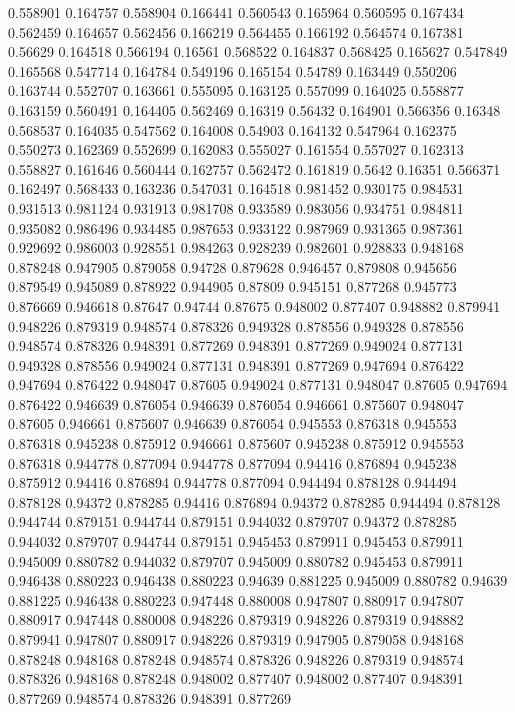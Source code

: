 0.558901 0.164757
0.558904 0.166441
0.560543 0.165964
0.560595 0.167434
0.562459 0.164657
0.562456 0.166219
0.564455 0.166192
0.564574 0.167381
0.56629 0.164518
0.566194 0.16561
0.568522 0.164837
0.568425 0.165627
0.547849 0.165568
0.547714 0.164784
0.549196 0.165154
0.54789 0.163449
0.550206 0.163744
0.552707 0.163661
0.555095 0.163125
0.557099 0.164025
0.558877 0.163159
0.560491 0.164405
0.562469 0.16319
0.56432 0.164901
0.566356 0.16348
0.568537 0.164035
0.547562 0.164008
0.54903 0.164132
0.547964 0.162375
0.550273 0.162369
0.552699 0.162083
0.555027 0.161554
0.557027 0.162313
0.558827 0.161646
0.560444 0.162757
0.562472 0.161819
0.5642 0.16351
0.566371 0.162497
0.568433 0.163236
0.547031 0.164518
0.981452 0.930175
0.984531 0.931513
0.981124 0.931913
0.981708 0.933589
0.983056 0.934751
0.984811 0.935082
0.986496 0.934485
0.987653 0.933122
0.987969 0.931365
0.987361 0.929692
0.986003 0.928551
0.984263 0.928239
0.982601 0.928833
0.948168 0.878248
0.947905 0.879058
0.94728 0.879628
0.946457 0.879808
0.945656 0.879549
0.945089 0.878922
0.944905 0.87809
0.945151 0.877268
0.945773 0.876669
0.946618 0.87647
0.94744 0.87675
0.948002 0.877407
0.948882 0.879941
0.948226 0.879319
0.948574 0.878326
0.949328 0.878556
0.949328 0.878556
0.948574 0.878326
0.948391 0.877269
0.948391 0.877269
0.949024 0.877131
0.949328 0.878556
0.949024 0.877131
0.948391 0.877269
0.947694 0.876422
0.947694 0.876422
0.948047 0.87605
0.949024 0.877131
0.948047 0.87605
0.947694 0.876422
0.946639 0.876054
0.946639 0.876054
0.946661 0.875607
0.948047 0.87605
0.946661 0.875607
0.946639 0.876054
0.945553 0.876318
0.945553 0.876318
0.945238 0.875912
0.946661 0.875607
0.945238 0.875912
0.945553 0.876318
0.944778 0.877094
0.944778 0.877094
0.94416 0.876894
0.945238 0.875912
0.94416 0.876894
0.944778 0.877094
0.944494 0.878128
0.944494 0.878128
0.94372 0.878285
0.94416 0.876894
0.94372 0.878285
0.944494 0.878128
0.944744 0.879151
0.944744 0.879151
0.944032 0.879707
0.94372 0.878285
0.944032 0.879707
0.944744 0.879151
0.945453 0.879911
0.945453 0.879911
0.945009 0.880782
0.944032 0.879707
0.945009 0.880782
0.945453 0.879911
0.946438 0.880223
0.946438 0.880223
0.94639 0.881225
0.945009 0.880782
0.94639 0.881225
0.946438 0.880223
0.947448 0.880008
0.947807 0.880917
0.947807 0.880917
0.947448 0.880008
0.948226 0.879319
0.948226 0.879319
0.948882 0.879941
0.947807 0.880917
0.948226 0.879319
0.947905 0.879058
0.948168 0.878248
0.948168 0.878248
0.948574 0.878326
0.948226 0.879319
0.948574 0.878326
0.948168 0.878248
0.948002 0.877407
0.948002 0.877407
0.948391 0.877269
0.948574 0.878326
0.948391 0.877269
